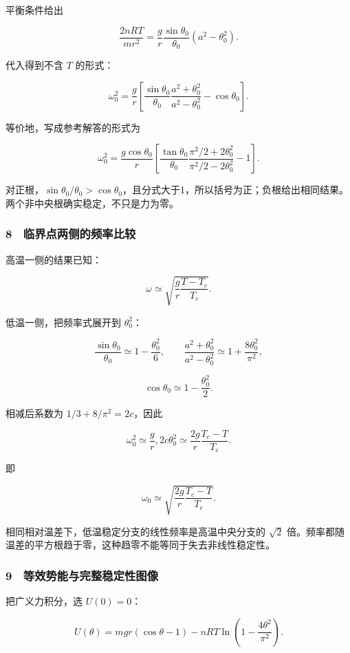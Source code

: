 \documentclass[12pt,a4paper,fontset=fandol]{ctexart}
\begin{document}
平衡条件给出

\[\frac{2nRT}{mr^2}
=\frac gr\frac{\sin\theta_0}{\theta_0}(a^2-\theta_0^2).\]

代入得到不含 \(T\) 的形式：

\[\boxed{\omega_0^2=\frac gr
\left[\frac{\sin\theta_0}{\theta_0}
\frac{a^2+\theta_0^2}{a^2-\theta_0^2}-\cos\theta_0\right].}\]

等价地，写成参考解答的形式为

\[\omega_0^2=\frac{g\cos\theta_0}{r}
\left[\frac{\tan\theta_0}{\theta_0}
\frac{\pi^2/2+2\theta_0^2}{\pi^2/2-2\theta_0^2}-1\right].\]

对正根，\(\sin\theta_0/\theta_0>\cos\theta_0\)，且分式大于1，所以括号为正；负根给出相同结果。两个非中央根确实稳定，不只是力为零。

\subsubsection{8　临界点两侧的频率比较}\label{ux4e34ux754cux70b9ux4e24ux4fa7ux7684ux9891ux7387ux6bd4ux8f83}

高温一侧的结果已知：

\[\boxed{\omega\simeq\sqrt{\frac gr\frac{T-T_c}{T_c}}.}\]

低温一侧，把频率式展开到 \(\theta_0^2\)：

\[\frac{\sin\theta_0}{\theta_0}\simeq1-\frac{\theta_0^2}{6},\qquad
\frac{a^2+\theta_0^2}{a^2-\theta_0^2}\simeq1+\frac{8\theta_0^2}{\pi^2},\]

\[\cos\theta_0\simeq1-\frac{\theta_0^2}{2}.\]

相减后系数为 \(1/3+8/\pi^2=2c\)，因此

\[\omega_0^2\simeq\frac gr,2c\theta_0^2
\simeq\frac{2g}{r}\frac{T_c-T}{T_c}.\]

即

\[\boxed{\omega_0\simeq\sqrt{\frac{2g}{r}\frac{T_c-T}{T_c}}.}\]

相同相对温差下，低温稳定分支的线性频率是高温中央分支的 \(\sqrt2\)
倍。频率都随温差的平方根趋于零，这种趋零不能等同于失去非线性稳定性。

\subsubsection{9　等效势能与完整稳定性图像}\label{ux7b49ux6548ux52bfux80fdux4e0eux5b8cux6574ux7a33ux5b9aux6027ux56feux50cf}

把广义力积分，选 \(U(0)=0\)：

\[\boxed{U(\theta)=mgr(\cos\theta-1)
-nRT\ln\left(1-\frac{4\theta^2}{\pi^2}\right).}\]
\end{document}
